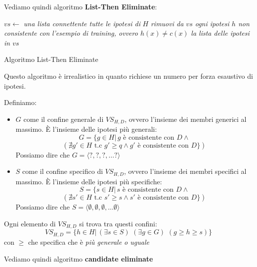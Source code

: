 \documentclass[a4paper,12pt, oneside]{book}
\begin{document}
Vediamo quindi algoritmo \textbf{List-Then Eliminate}:
\begin{algorithm}[H]
  \begin{algorithmic}
    \State $vs \gets$ \textit{una lista connettente tutte le ipotesi di } $H$
    \State \textit{rimuovi da $vs$ ogni ipotesi $h$ non consistente con}
    \State \textit{l'esempio di training, ovvero $h(x)\neq c(x)$}
    \EndFor
    \Return \textit{la lista delle ipotesi in $vs$}
    \EndFunction
  \end{algorithmic}
  \caption{Algoritmo List-Then Eliminate}
\end{algorithm}
Questo algoritmo è irrealistico in quanto richiese un numero per forza esaustivo
di ipotesi.
\begin{definizione}
  Definiamo:
  \begin{itemize}
    \item $G$ come il confine generale di $VS_{H,D}$, ovvero l'insieme dei
    membri generici al massimo. È l'insieme delle ipotesi più generali:
    \[G=\{g\in H|\, g\mbox{ è consistente con }D \land\]
    \[ (\nexists g'\in H \mbox{ t.c } g'\geq q \land g'\mbox{ è consistente con
      }D\})\]
    Possiamo dire che $G=\langle ?,?,?,\ldots ?\rangle$
    \item $S$ come il confine specifico di $VS_{H,D}$, ovvero l'insieme dei
    membri specifici al massimo. È l'insieme delle ipotesi più specifiche:
     \[S=\{s\in H|\, s\mbox{ è consistente con }D \land\]
    \[ (\nexists s'\in H \mbox{ t.c } s'\geq s \land s'\mbox{ è consistente con
      }D\})\]
    Possiamo dire che $S=\langle \emptyset,\emptyset,\emptyset,\ldots \emptyset
    \rangle$ 
  \end{itemize}
  Ogni elemento di $VS_{H,D}$ si trova tra questi confini:
  \[VS_{H,D}=\{h\in H|\,(\exists s\in S)\,\,(\exists g\in G)\,\,(g\geq h\geq
    s)\}\]
  con $\geq$ che specifica che è \textit{più generale o uguale}
\end{definizione}
Vediamo quindi algoritmo \textbf{candidate eliminate}
\end{document}
